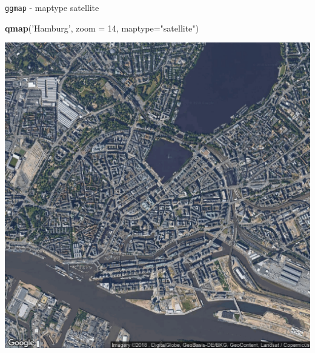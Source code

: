 \documentclass[ignorenonframetext,]{beamer}
\newenvironment{Shaded}{\begin{snugshade}}{\end{snugshade}}
\newcommand{\KeywordTok}[1]{\textcolor[rgb]{0.13,0.29,0.53}{\textbf{#1}}}
\newcommand{\DataTypeTok}[1]{\textcolor[rgb]{0.13,0.29,0.53}{#1}}
\newcommand{\DecValTok}[1]{\textcolor[rgb]{0.00,0.00,0.81}{#1}}
\newcommand{\StringTok}[1]{\textcolor[rgb]{0.31,0.60,0.02}{#1}}
\newcommand{\NormalTok}[1]{#1}
\begin{document}
\begin{frame}[fragile]{\texttt{ggmap} - maptype satellite}

\begin{Shaded}
\begin{Highlighting}[]
\KeywordTok{qmap}\NormalTok{(}\StringTok{'Hamburg'}\NormalTok{, }\DataTypeTok{zoom =} \DecValTok{14}\NormalTok{, }\DataTypeTok{maptype=}\StringTok{"satellite"}\NormalTok{)}
\end{Highlighting}
\end{Shaded}

\includegraphics{figure/ham_map_sat.pdf}

\end{frame}
\end{document}
